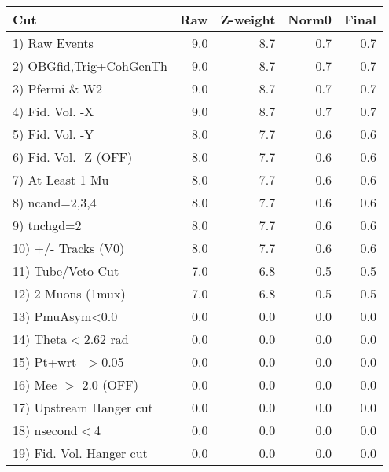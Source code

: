  \begin{table}[h!]\centering
 \begin{tabular}{||l||r|r|r|r||}
 \hline
 \hline
 Cut & Raw & Z-weight & Norm0 & Final \\
 \hline
  1) Raw Events           &         9.0 &         8.7 &         0.7 &         0.7 \\
  2) OBGfid,Trig+CohGenTh &         9.0 &         8.7 &         0.7 &         0.7 \\
  3) Pfermi \& W2         &         9.0 &         8.7 &         0.7 &         0.7 \\
  4) Fid. Vol. -X         &         9.0 &         8.7 &         0.7 &         0.7 \\
  5) Fid. Vol. -Y         &         8.0 &         7.7 &         0.6 &         0.6 \\
  6) Fid. Vol. -Z (OFF)   &         8.0 &         7.7 &         0.6 &         0.6 \\
  7) At Least 1 Mu        &         8.0 &         7.7 &         0.6 &         0.6 \\
  8) ncand=2,3,4          &         8.0 &         7.7 &         0.6 &         0.6 \\
  9) tnchgd=2             &         8.0 &         7.7 &         0.6 &         0.6 \\
 10) +/- Tracks (V0)      &         8.0 &         7.7 &         0.6 &         0.6 \\
 11) Tube/Veto Cut        &         7.0 &         6.8 &         0.5 &         0.5 \\
 12) 2 Muons (1mux)       &         7.0 &         6.8 &         0.5 &         0.5 \\
 13) PmuAsym<0.0          &         0.0 &         0.0 &         0.0 &         0.0 \\
 14) Theta$<$2.62 rad     &         0.0 &         0.0 &         0.0 &         0.0 \\
 15) Pt+wrt- $>$0.05      &         0.0 &         0.0 &         0.0 &         0.0 \\
 16) Mee $>$ 2.0  (OFF)   &         0.0 &         0.0 &         0.0 &         0.0 \\
 17) Upstream Hanger cut  &         0.0 &         0.0 &         0.0 &         0.0 \\
 18) nsecond$<$4          &         0.0 &         0.0 &         0.0 &         0.0 \\
 19) Fid. Vol. Hanger cut &         0.0 &         0.0 &         0.0 &         0.0 \\

\end{tabular}
\end{table}
